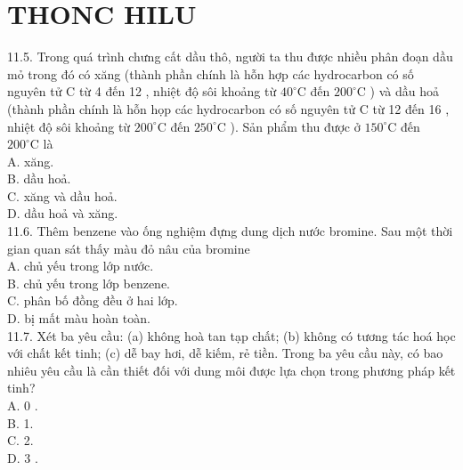 \documentclass[10pt]{article}
\begin{document}
\section*{THONC HILU}
11.5. Trong quá trình chưng cất dầu thô, người ta thu được nhiều phân đoạn dầu mỏ trong đó có xăng (thành phần chính là hỗn hợp các hydrocarbon có số nguyên tử C từ 4 đến 12 , nhiệt độ sôi khoảng từ $40^{\circ} \mathrm{C}$ đến $200^{\circ} \mathrm{C}$ ) và dầu hoả (thành phần chính là hỗn họp các hydrocarbon có số nguyên tử C từ 12 đến 16 , nhiệt độ sôi khoảng từ $200^{\circ} \mathrm{C}$ đến $250^{\circ} \mathrm{C}$ ). Sản phẩm thu được ở $150^{\circ} \mathrm{C}$ đến $200^{\circ} \mathrm{C}$ là\\
A. xăng.\\
B. dầu hoả.\\
C. xăng và dầu hoả.\\
D. dầu hoả và xăng.\\
11.6. Thêm benzene vào ống nghiệm đựng dung dịch nước bromine. Sau một thời gian quan sát thấy màu đỏ nâu của bromine\\
A. chủ yếu trong lớp nước.\\
B. chủ yếu trong lớp benzene.\\
C. phân bố đồng đều ở hai lớp.\\
D. bị mất màu hoàn toàn.\\
11.7. Xét ba yêu cầu: (a) không hoà tan tạp chất; (b) không có tương tác hoá học với chất kết tinh; (c) dễ bay hơi, dễ kiếm, rẻ tiền. Trong ba yêu cầu này, có bao nhiêu yêu cầu là cần thiết đối với dung môi được lựa chọn trong phương pháp kết tinh?\\
A. 0 .\\
B. 1.\\
C. 2.\\
D. 3 .
\end{document}
